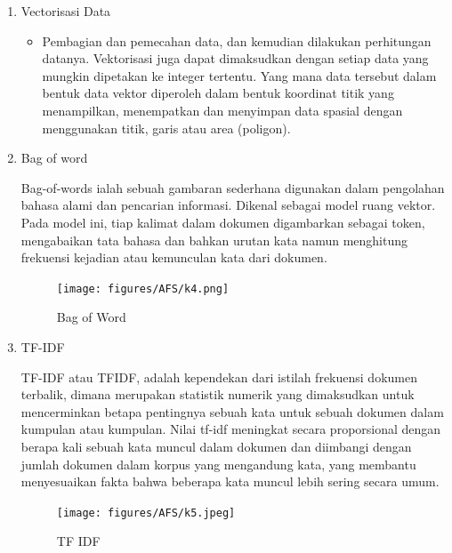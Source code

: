 \begin{enumerate}
\item Vectorisasi Data
	\begin{itemize}
		\item Pembagian dan pemecahan data, dan kemudian dilakukan perhitungan datanya. Vektorisasi juga dapat dimaksudkan dengan setiap data yang mungkin dipetakan ke integer tertentu. Yang mana data tersebut dalam bentuk data vektor diperoleh dalam bentuk koordinat titik yang menampilkan, menempatkan dan menyimpan data spasial dengan menggunakan titik, garis atau area (poligon). 
	\end{itemize}
	
\item Bag of word
	\par Bag-of-words ialah sebuah gambaran sederhana digunakan dalam pengolahan bahasa alami dan pencarian informasi. Dikenal sebagai model ruang vektor. Pada model ini, tiap kalimat dalam dokumen digambarkan sebagai token, mengabaikan tata bahasa dan bahkan urutan kata namun menghitung frekuensi kejadian atau kemunculan kata dari dokumen.
	\begin{figure}[ht]
		\centering
		\texttt{[image: figures/AFS/k4.png]}
		\caption{Bag of Word}
		\label{contoh}
	\end{figure}
	
\item TF-IDF
	\par TF-IDF atau TFIDF, adalah kependekan dari istilah frekuensi dokumen terbalik, dimana merupakan statistik numerik yang dimaksudkan untuk mencerminkan betapa pentingnya sebuah kata untuk sebuah dokumen dalam kumpulan atau kumpulan. Nilai tf-idf meningkat secara proporsional dengan berapa kali sebuah kata muncul dalam dokumen dan diimbangi dengan jumlah dokumen dalam korpus yang mengandung kata, yang membantu menyesuaikan fakta bahwa beberapa kata muncul lebih sering secara umum.
	\begin{figure}[ht]
		\centering
		\texttt{[image: figures/AFS/k5.jpeg]}
		\caption{TF IDF}
		\label{contoh}
	\end{figure}
\end{enumerate}


